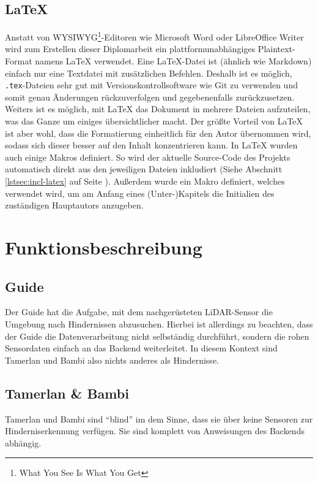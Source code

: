 \subsection{\LaTeX}
\label{subsec:latex}
Anstatt von WYSIWYG\footnote{What You See Is What You Get}-Editoren
wie Microsoft Word oder LibreOffice Writer wird zum Erstellen dieser Diplomarbeit
ein plattformunabhängiges Plaintext-Format namens LaTeX \cite{latex} verwendet.
Eine LaTeX-Datei ist (ähnlich wie Markdown) einfach nur eine Textdatei mit zusätzlichen Befehlen.
Deshalb ist es möglich, \texttt{.tex}-Dateien sehr gut mit Versionskontrollsoftware wie Git zu verwenden
und somit genau Änderungen rückzuverfolgen und gegebenenfalls zurückzusetzen.
%
Weiters ist es möglich, mit LaTeX das Dokument in mehrere Dateien aufzuteilen,
was das Ganze um einiges übersichtlicher macht.
%
Der größte Vorteil von LaTeX ist aber wohl,
dass die Formatierung einheitlich für den Autor übernommen wird,
sodass sich dieser besser auf den Inhalt konzentrieren kann.
%
In LaTeX wurden auch einige Makros definiert.
%
So wird der aktuelle Source-Code des Projekts automatisch direkt aus den
jeweiligen Dateien inkludiert (Siehe Abschnitt \ref{lstsec:incl-latex} auf Seite \pageref{lstsec:incl-latex}).
%
Außerdem wurde ein Makro definiert,
welches verwendet wird,
um am Anfang eines (Unter-)Kapitels die Initialien des zuständigen Hauptautors anzugeben. 

\section{Funktionsbeschreibung}
\label{subsec:funktionsbeschreibung}

\subsection{Guide}
Der Guide hat die Aufgabe,
mit dem nachgerüsteten LiDAR-Sensor die Umgebung nach Hindernissen abzusuchen.
%
Hierbei ist allerdings zu beachten,
dass der Guide die Datenverarbeitung nicht selbständig durchführt,
sondern die rohen Sensordaten einfach an das Backend weiterleitet.
%
In diesem Kontext sind Tamerlan und Bambi also nichts anderes als Hindernisse.

\subsection{Tamerlan \& Bambi}
Tamerlan und Bambi sind ``blind'' im dem Sinne,
dass sie über keine Sensoren zur Hinderniserkennung verfügen.
%
Sie sind komplett von Anweisungen des Backends abhängig.

